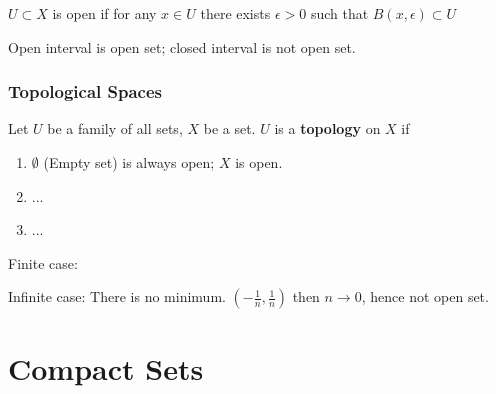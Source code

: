 \documentclass{article}
\begin{document}
        $U \subset X$ is open if for any $x \in U$ there exists $\epsilon > 0$ such that $B(x, \epsilon) \subset U$

        Open interval is open set; closed interval is not open set.

        \subsubsection{Topological Spaces}

        Let $U$ be a family of all sets, $X$ be a set. $U$ is a \textbf{topology} on $X$ if

        \begin{enumerate}
            \item $\emptyset$ (Empty set) is always open; $X$ is open.
            \item ...
            \item ...
        \end{enumerate}

        Finite case: 

        Infinite case: There is no minimum. $( -\frac{1}{n}, \frac{1}{n})$ then $n \to 0$, hence not open set.

    \section{Compact Sets}
\end{document}
